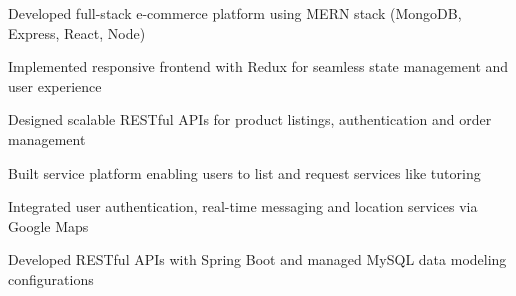 \documentclass[letterpaper,11pt]{article}
\begin{document}
\item Developed full-stack e-commerce platform using MERN stack (MongoDB, Express, React, Node)  
\item Implemented responsive frontend with Redux for seamless state management and user experience
\item Designed scalable RESTful APIs for product listings, authentication and order management

\item Built service platform enabling users to list and request services like tutoring
\item Integrated user authentication, real-time messaging and location services via Google Maps 
\item Developed RESTful APIs with Spring Boot and managed MySQL data modeling configurations
\end{document}
